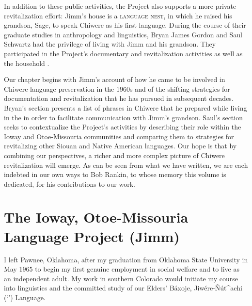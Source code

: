 \documentclass[output=paper]{LSP/langsci}
\begin{document}
In addition to these public activities, the Project also supports a more private revitalization effort: Jimm's house is a \textsc{language nest}, in which he raised his grandson, Sage, to speak Chiwere as his first language. During the course of their graduate studies in anthropology and linguistics, Bryan James Gordon and Saul Schwartz had the privilege of living with Jimm and his grandson. They participated in the Project's documentary and revitalization activities as well as the household .

Our chapter begins with Jimm's account of how he came to be involved in Chiwere language preservation in the 1960s and of the shifting strategies for documentation and revitalization that he has pursued in subsequent decades. Bryan's section presents a list of phrases in Chiwere that he prepared while living in the  in order to facilitate communication with Jimm's grandson. Saul's section seeks to contextualize the Project's activities by describing their role within the Ioway and Otoe-Missouria communities and comparing them to strategies for revitalizing other Siouan and Native American languages. Our hope is that by combining our perspectives, a richer and more complex picture of Chiwere revitalization will emerge. As can be seen from what we have written, we are each indebted in our own ways to Bob Rankin, to whose memory this volume is dedicated, for his contributions to our work.

\section{The {Ioway, Otoe-Missouria} Language Project (Jimm)}

I left Pawnee, Oklahoma, after my graduation from Oklahoma State University in May 1965 to begin my first genuine employment in social welfare and to live as an independent adult. My work in southern Colorado would initiate my course into linguistics and the committed study of our Elders' Báxoje, Jiwére-\~Nút\^{ }achi (`') Language.
\end{document}
